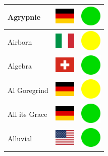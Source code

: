 \documentclass[12pt, a4paper, twoside]{report}
\begin{document}
\begin{center}
\begin{longtable}{|p{5cm}|p{2cm}|p{2cm}|}
Agrypnie & \includegraphics[width=1cm]{4x3/de} & \includegraphics[width=1cm]{likes/y} \\ \hline
Airborn & \includegraphics[width=1cm]{4x3/it} & \includegraphics[width=1cm]{likes/m} \\ \hline
Algebra & \includegraphics[width=1cm]{4x3/ch} & \includegraphics[width=1cm]{likes/y} \\ \hline
Al Goregrind & \includegraphics[width=1cm]{4x3/de} & \includegraphics[width=1cm]{likes/m} \\ \hline
All its Grace & \includegraphics[width=1cm]{4x3/de} & \includegraphics[width=1cm]{likes/y} \\ \hline
Alluvial & \includegraphics[width=1cm]{4x3/us} & \includegraphics[width=1cm]{likes/y} \\ \hline

\end{longtable}
\end{center}
\end{document}
